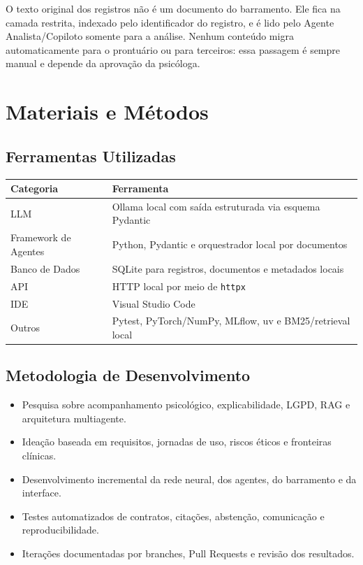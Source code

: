 \documentclass[12pt,a4paper]{article}
\newcommand{\cab}[1]{\textbf{#1}}
\begin{document}
O texto original dos registros não é um documento do barramento. Ele fica na camada restrita,
indexado pelo identificador do registro, e é lido pelo Agente Analista/Copiloto somente para a
análise. Nenhum conteúdo migra automaticamente para o prontuário ou para terceiros: essa passagem
é sempre manual e depende da aprovação da psicóloga.


\section{Materiais e Métodos}

\subsection{Ferramentas Utilizadas}
\begin{tabularx}{\textwidth}{|p{5cm}|Y|}
  \hline
  \cab{Categoria} & \cab{Ferramenta} \\ \hline
  LLM                  & Ollama local com saída estruturada via esquema Pydantic \\ \hline
  Framework de Agentes & Python, Pydantic e orquestrador local por documentos \\ \hline
  Banco de Dados       & SQLite para registros, documentos e metadados locais \\ \hline
  API                  & HTTP local por meio de \texttt{httpx} \\ \hline
  IDE                  & Visual Studio Code \\ \hline
  Outros               & Pytest, PyTorch/NumPy, MLflow, uv e BM25/retrieval local \\ \hline
\end{tabularx}

\subsection{Metodologia de Desenvolvimento}
\begin{itemize}
  \item Pesquisa sobre acompanhamento psicológico, explicabilidade, LGPD, RAG e arquitetura multiagente.
  \item Ideação baseada em requisitos, jornadas de uso, riscos éticos e fronteiras clínicas.
  \item Desenvolvimento incremental da rede neural, dos agentes, do barramento e da interface.
  \item Testes automatizados de contratos, citações, abstenção, comunicação e reproducibilidade.
  \item Iterações documentadas por branches, Pull Requests e revisão dos resultados.
\end{itemize}
\end{document}
